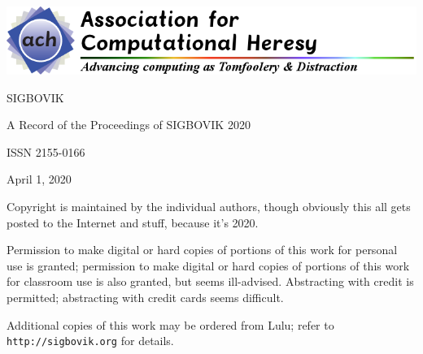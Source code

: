 \documentclass[12pt]{article}
\begin{document}
\newcommand\thisyear{2020}

\includegraphics[width=\textwidth]{copyright-header.png}\\
\vspace{10em}

SIGBOVIK

A Record of the Proceedings of SIGBOVIK \thisyear

ISSN 2155-0166

April 1, \thisyear

\vspace{2em}

Copyright is maintained by the individual authors, though obviously this all gets posted to the Internet and stuff, because it's \thisyear.

Permission to make digital or hard copies of portions of this work for personal use is granted; permission to make digital or hard copies of portions of this work for classroom use is also granted, but seems ill-advised.
Abstracting with credit is permitted; abstracting with credit cards seems difficult.

Additional copies of this work may be ordered from Lulu; refer to {\tt http://sigbovik.org} for details.

\thispagestyle{empty}
\end{document}
